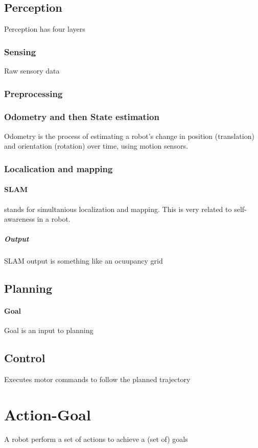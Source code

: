     \subsection{Perception}
        Perception has four layers
        \subsubsection{Sensing}
            Raw sensory data
        \subsubsection{Preprocessing}
        \subsubsection{Odometry and then State estimation}
            Odometry is the process of estimating a robot’s change in position (translation) and orientation (rotation) over time, using motion sensors.
        \subsubsection{Localication and mapping}
            \paragraph{SLAM}
                stands for simultanious localization and mapping. This is very related to self-awareness in a robot.
                    \subparagraph{Output}
                    SLAM output is  something like an ocuupancy grid
    
    \subsection{Planning}
        \paragraph{Goal} Goal is an input to planning
    \subsection{Control}
        Executes motor commands to follow the planned trajectory
            

\section{Action-Goal}
    A robot perform a set of actions to achieve a (set of) goals
